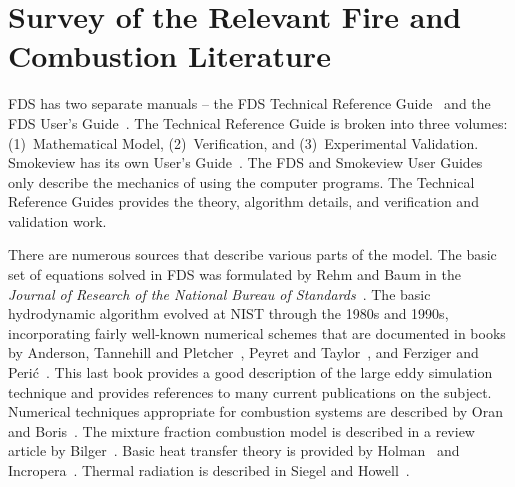 \documentclass[11pt]{book}
\begin{document}
\section{Survey of the Relevant Fire and Combustion Literature}

\label{Relevantdocs}

FDS has two separate manuals -- the FDS Technical Reference Guide~\cite{FDS_Tech_Guide} and the FDS User's Guide~\cite{FDS_Users_Guide}. The
Technical Reference Guide is broken into three volumes: (1)~Mathematical Model, (2)~Verification, and (3)~Experimental Validation. Smokeview has its
own User's Guide~\cite{Smokeview_Users_Guide}. The FDS and Smokeview User Guides only describe the mechanics of using the computer programs. The
Technical Reference Guides provides the theory, algorithm details, and verification and validation work.

There are numerous sources that describe various parts of the model. The basic set of equations solved in FDS was formulated by Rehm and Baum in the
{\em Journal of Research of the National Bureau of Standards}~\cite{Rehm:1}.  The basic hydrodynamic algorithm evolved at NIST through the 1980s and
1990s, incorporating fairly well-known numerical schemes that are documented in books by Anderson, Tannehill and Pletcher~\cite{Anderson:1}, Peyret
and Taylor~\cite{Peyret:1}, and Ferziger and Peri\'{c}~\cite{Ferziger:1}. This last book provides a good description of the large eddy simulation
technique and provides references to many current publications on the subject.  Numerical techniques appropriate for combustion systems are described
by Oran and Boris~\cite{Oran:1}.  The mixture fraction combustion model is described in a review article by Bilger~\cite{Bilger:AnnRev}. Basic heat
transfer theory is provided by Holman~\cite{Holman:1} and Incropera~\cite{Incropera:1}. Thermal radiation is described in Siegel and
Howell~\cite{Siegel:1}.
\end{document}
